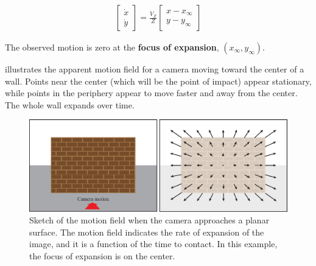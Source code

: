 \begin{align}
    \begin{bmatrix}
        \dot{x} \\
        \dot{y}
    \end{bmatrix}
    =
    \frac{V_Z}{Z}
    \begin{bmatrix}
        x - x_{\infty} \\
        y - y_{\infty}
    \end{bmatrix}
\end{align}


The observed motion is zero at the {\bf focus of expansion}, $(x_{\infty}, y_{\infty})$. 

\Fig{\ref{fig:camera_forward_translation_flow}} illustrates the apparent motion field for a camera moving toward the center of a wall. Points near the center (which will be the point of impact) appear stationary, while points in the periphery appear to move faster and away from the center. The whole wall expands over time.

\begin{figure}[h!]
    \centerline{
        \includegraphics[width=1\linewidth]{figures/optical_flow/camera_forward_translation_flow.eps}
    }
    \caption{Sketch of the motion field when the camera approaches a planar surface. The motion field indicates the rate of expansion of the image, and it is a function of the time to contact. In this example, the focus of expansion is on the center.}
    \label{fig:camera_forward_translation_flow}
\end{figure}

